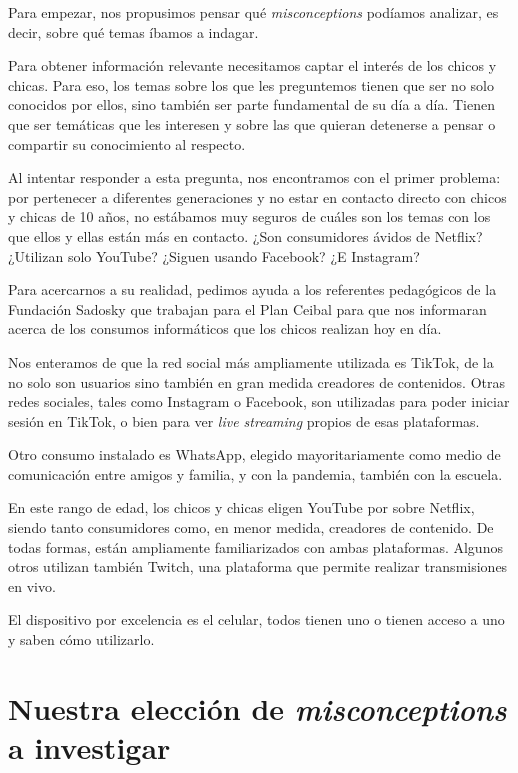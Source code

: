 Para empezar, nos propusimos pensar qué \textit{misconceptions} podíamos analizar, es decir, sobre qué temas íbamos a indagar.

Para obtener información relevante necesitamos captar el interés de los chicos y chicas. Para eso, los temas sobre los que les preguntemos tienen que ser no solo conocidos por ellos, sino también ser parte fundamental de su día a día. Tienen que ser temáticas que les interesen y sobre las que quieran detenerse a pensar o compartir su conocimiento al respecto.

Al intentar responder a esta pregunta, nos encontramos con el primer problema: por pertenecer a diferentes generaciones y no estar en contacto directo con chicos y chicas de 10 años, no estábamos muy seguros de cuáles son los temas con los que ellos y ellas están más en contacto. ¿Son consumidores ávidos de Netflix? ¿Utilizan solo YouTube? ¿Siguen usando Facebook? ¿E Instagram?

Para acercarnos a su realidad, pedimos ayuda a los referentes pedagógicos de la Fundación Sadosky que trabajan para el Plan Ceibal para que nos informaran acerca de los consumos informáticos que los chicos realizan hoy en día.

Nos enteramos de que la red social más ampliamente utilizada es TikTok, de la no solo son usuarios sino también en gran medida creadores de contenidos. Otras redes sociales, tales como Instagram o Facebook, son utilizadas para poder iniciar sesión en TikTok, o bien para ver \textit{live streaming} propios de esas plataformas.

Otro consumo instalado es WhatsApp, elegido mayoritariamente como medio de comunicación entre amigos y familia, y con la pandemia, también con la escuela.

En este rango de edad, los chicos y chicas eligen YouTube por sobre Netflix, siendo tanto consumidores como, en menor medida, creadores de contenido. De todas formas, están ampliamente familiarizados con ambas plataformas. Algunos otros utilizan también Twitch, una plataforma que permite realizar transmisiones en vivo.

El dispositivo por excelencia es el celular, todos tienen uno o tienen acceso a uno y saben cómo utilizarlo.

\section{Nuestra elección de \textit{misconceptions} a investigar}

